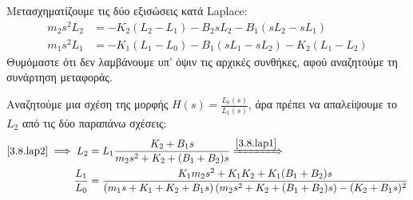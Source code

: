 \documentclass[11pt,a4paper,notitlepage,fleqn]{article}
\begin{document}
\begin{exercise}{3.8}
Μετασχηματίζουμε τις δύο εξισώσεις κατά Laplace:
\begin{align}
	m_2s^2L_2 &= -K_2(L_2-L_1) - B_2sL_2 - B_1(sL_2-sL_1) \label{3.8.lap2} \\
	m_1s^2L_1 &= -K_1(L_1-L_0) - B_1(sL_1-sL_2) - K_2(L_1-L_2) \label{3.8.lap1}
\end{align}
Θυμόμαστε ότι δεν λαμβάνουμε υπ' όψιν τις αρχικές συνθήκες, αφού αναζητούμε τη συνάρτηση
μεταφοράς.

Αναζητούμε μια σχέση της μορφής \( H(s) = \frac{L_0(s)}{L_1(s)} \), άρα πρέπει να απαλείψουμε
το \( L_2 \) από τις δύο παραπάνω σχέσεις:
\begin{align*}
	\eqref{3.8.lap2} \implies L_2 &=
	L_1 \frac{K_2+B_1s}{m_2s^2+K_2+(B_1+B_2)s} \xRightarrow{\eqref{3.8.lap1}} \\
	\frac{L_1}{L_0}
	&= \frac{K_1m_2s^2+K_1K_2+K_1(B_1+B_2)s}{
		(m_1s+K_1+K_2+B_1s)\left(m_2s^2+K_2+(B_1+B_2)s\right)-(K_2+B_1s)^2}
\end{align*}

\end{exercise}
\end{document}
